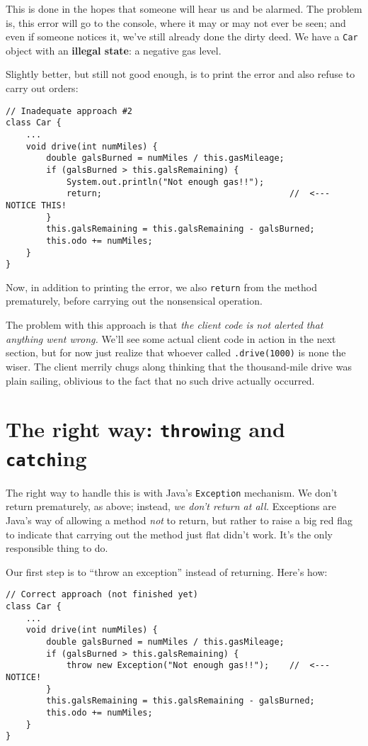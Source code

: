 This is done in the hopes that someone will hear us and be alarmed. The
problem is, this error will go to the console, where it may or may not ever be
seen; and even if someone notices it, we've still already done the dirty deed.
We have a \texttt{Car} object with an \textbf{illegal state}: a negative gas
level.

Slightly better, but still not good enough, is to print the error and also
refuse to carry out orders:

\begin{Verbatim}[samepage=true,fontsize=\footnotesize,frame=single]
// Inadequate approach #2
class Car {
    ...
    void drive(int numMiles) {
        double galsBurned = numMiles / this.gasMileage;
        if (galsBurned > this.galsRemaining) {
            System.out.println("Not enough gas!!");
            return;                                     //  <---  NOTICE THIS!
        }
        this.galsRemaining = this.galsRemaining - galsBurned;
        this.odo += numMiles;
    }
}
\end{Verbatim}

Now, in addition to printing the error, we also \texttt{return} from the
method prematurely, before carrying out the nonsensical operation.

The problem with this approach is that \textit{the client code is not alerted
that anything went wrong.} We'll see some actual client code in action in the
next section, but for now just realize that whoever called
\texttt{.drive(1000)} is none the wiser. The client merrily chugs along
thinking that the thousand-mile drive was plain sailing, oblivious to the fact
that no such drive actually occurred.

\section{The right way: \texttt{throw}ing and \texttt{catch}ing}

The right way to handle this is with Java's \texttt{Exception} mechanism. We
don't return prematurely, as above; instead, \textit{we don't return at all.}
Exceptions are Java's way of allowing a method \textit{not} to return, but
rather to raise a big red flag to indicate that carrying out the method just
flat didn't work. It's the only responsible thing to do.

Our first step is to ``throw an exception'' instead of returning. Here's how:

\begin{Verbatim}[samepage=true,fontsize=\small,frame=single]
// Correct approach (not finished yet)
class Car {
    ...
    void drive(int numMiles) {
        double galsBurned = numMiles / this.gasMileage;
        if (galsBurned > this.galsRemaining) {
            throw new Exception("Not enough gas!!");    //  <---  NOTICE!
        }
        this.galsRemaining = this.galsRemaining - galsBurned;
        this.odo += numMiles;
    }
}
\end{Verbatim}

